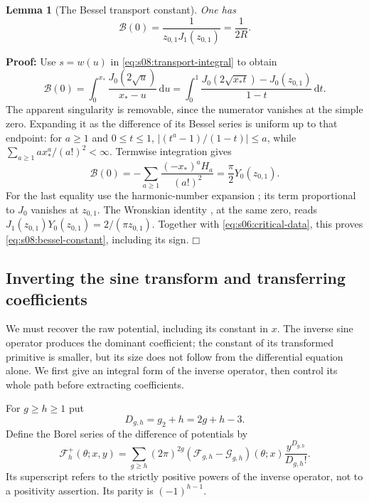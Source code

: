\documentclass[a4paper,10pt]{article}
\numberwithin{equation}{section}
\newcommand{\dd}{\mathrm{d}}
\theoremstyle{paperplain}
\newtheorem{lmm}[thm]{Lemma}
\theoremstyle{paperremark}
\theoremstyle{paperplain}
\newenvironment{prf}{\noindent \textbf{Proof: }}{\hfill $\mdlgwhtsquare$\par\addvspace{0.5\baselineskip}}
\begin{document}
\begin{lmm}[The Bessel transport constant]\label{lmm:s08:bessel-constant}
One has
\begin{equation}\label{eq:s08:bessel-constant}
 \mathcal B(0)=\frac1{z_{0,1}J_1(z_{0,1})}=\frac1{2R}.
\end{equation}
\end{lmm}
\begin{prf}
Use $s=w(u)$ in \eqref{eq:s08:transport-integral} to obtain
\begin{equation}\label{eq:s08:bessel-integral}
 \mathcal B(0)=\int_0^{x_*}\frac{J_0(2\sqrt u)}{x_*-u}\,\dd u
 =\int_0^1\frac{J_0(2\sqrt{x_*t})-J_0(z_{0,1})}{1-t}\,\dd t.
\end{equation}
The apparent singularity is removable, since the numerator vanishes
at the simple zero. Expanding it as the difference of its Bessel
series is uniform up to that endpoint: for $a\geq1$ and
$0\leq t\leq1$, $|(t^a-1)/(1-t)|\leq a$, while
$\sum_{a\geq1}a x_*^a/(a!)^2<\infty$. Termwise integration gives
\begin{equation}\label{eq:s08:harmonic-sum}
 \mathcal B(0)=-\sum_{a\geq1}\frac{(-x_*)^aH_a}{(a!)^2}
                              =\frac\pi2Y_0(z_{0,1}).
\end{equation}
For the last equality use the harmonic-number expansion
\cite[(10.8.2)]{DLMF}; its term proportional to $J_0$ vanishes
at $z_{0,1}$. The Wronskian identity
\cite[(10.5.2)]{DLMF}, at the same zero, reads
$J_1(z_{0,1})Y_0(z_{0,1})=2/(\pi z_{0,1})$.
Together with \eqref{eq:s06:critical-data}, this proves
\eqref{eq:s08:bessel-constant}, including its sign.
\end{prf}

\subsection{Inverting the sine transform and transferring coefficients}
\label{subsec:s08:04}

We must recover the raw potential, including its constant in $x$.
The inverse sine operator produces the dominant coefficient; the
constant of its transformed primitive is smaller, but its size does
not follow from the differential equation alone. We first give an
integral form of the inverse operator, then control its whole path
before extracting coefficients.

For $g\geq h\geq1$ put
\begin{equation}\label{eq:s08:degree}
 D_{g,h}=g_2+h=2g+h-3.
\end{equation}
Define the Borel series of the difference of potentials by
\begin{equation}\label{eq:s08:inverse-borel-definition}
 \mathcal F_h^+(\theta;x,y)
 =\sum_{g\geq h}(2\pi)^{2g}
   (\mathcal F_{g,h}-\mathcal G_{g,h})(\theta;x)
                       \frac{y^{D_{g,h}}}{D_{g,h}!}.
\end{equation}
Its superscript refers to the strictly positive powers of the inverse
operator, not to a positivity assertion. Its parity is $(-1)^{h-1}$.
\end{document}
